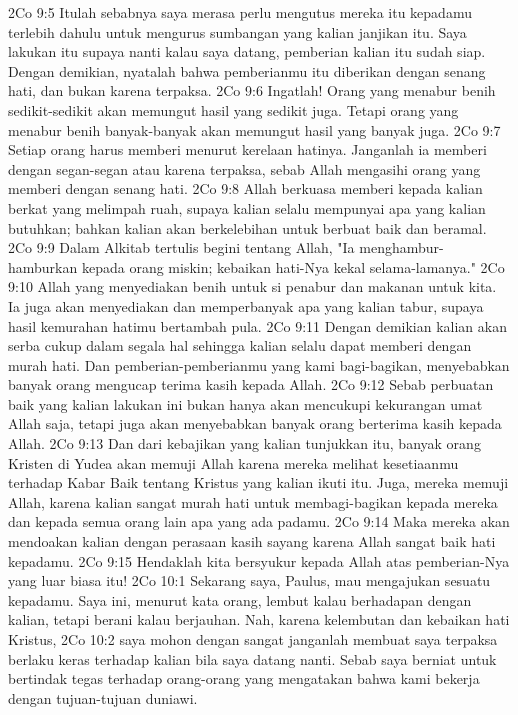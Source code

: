 2Co 9:5  Itulah sebabnya saya merasa perlu mengutus mereka itu kepadamu terlebih dahulu untuk mengurus sumbangan yang kalian janjikan itu. Saya lakukan itu supaya nanti kalau saya datang, pemberian kalian itu sudah siap. Dengan demikian, nyatalah bahwa pemberianmu itu diberikan dengan senang hati, dan bukan karena terpaksa.
2Co 9:6  Ingatlah! Orang yang menabur benih sedikit-sedikit akan memungut hasil yang sedikit juga. Tetapi orang yang menabur benih banyak-banyak akan memungut hasil yang banyak juga.
2Co 9:7  Setiap orang harus memberi menurut kerelaan hatinya. Janganlah ia memberi dengan segan-segan atau karena terpaksa, sebab Allah mengasihi orang yang memberi dengan senang hati.
2Co 9:8  Allah berkuasa memberi kepada kalian berkat yang melimpah ruah, supaya kalian selalu mempunyai apa yang kalian butuhkan; bahkan kalian akan berkelebihan untuk berbuat baik dan beramal.
2Co 9:9  Dalam Alkitab tertulis begini tentang Allah, "Ia menghambur-hamburkan kepada orang miskin; kebaikan hati-Nya kekal selama-lamanya."
2Co 9:10  Allah yang menyediakan benih untuk si penabur dan makanan untuk kita. Ia juga akan menyediakan dan memperbanyak apa yang kalian tabur, supaya hasil kemurahan hatimu bertambah pula.
2Co 9:11  Dengan demikian kalian akan serba cukup dalam segala hal sehingga kalian selalu dapat memberi dengan murah hati. Dan pemberian-pemberianmu yang kami bagi-bagikan, menyebabkan banyak orang mengucap terima kasih kepada Allah.
2Co 9:12  Sebab perbuatan baik yang kalian lakukan ini bukan hanya akan mencukupi kekurangan umat Allah saja, tetapi juga akan menyebabkan banyak orang berterima kasih kepada Allah.
2Co 9:13  Dan dari kebajikan yang kalian tunjukkan itu, banyak orang Kristen di Yudea akan memuji Allah karena mereka melihat kesetiaanmu terhadap Kabar Baik tentang Kristus yang kalian ikuti itu. Juga, mereka memuji Allah, karena kalian sangat murah hati untuk membagi-bagikan kepada mereka dan kepada semua orang lain apa yang ada padamu.
2Co 9:14  Maka mereka akan mendoakan kalian dengan perasaan kasih sayang karena Allah sangat baik hati kepadamu.
2Co 9:15  Hendaklah kita bersyukur kepada Allah atas pemberian-Nya yang luar biasa itu!
2Co 10:1  Sekarang saya, Paulus, mau mengajukan sesuatu kepadamu. Saya ini, menurut kata orang, lembut kalau berhadapan dengan kalian, tetapi berani kalau berjauhan. Nah, karena kelembutan dan kebaikan hati Kristus,
2Co 10:2  saya mohon dengan sangat janganlah membuat saya terpaksa berlaku keras terhadap kalian bila saya datang nanti. Sebab saya berniat untuk bertindak tegas terhadap orang-orang yang mengatakan bahwa kami bekerja dengan tujuan-tujuan duniawi.
